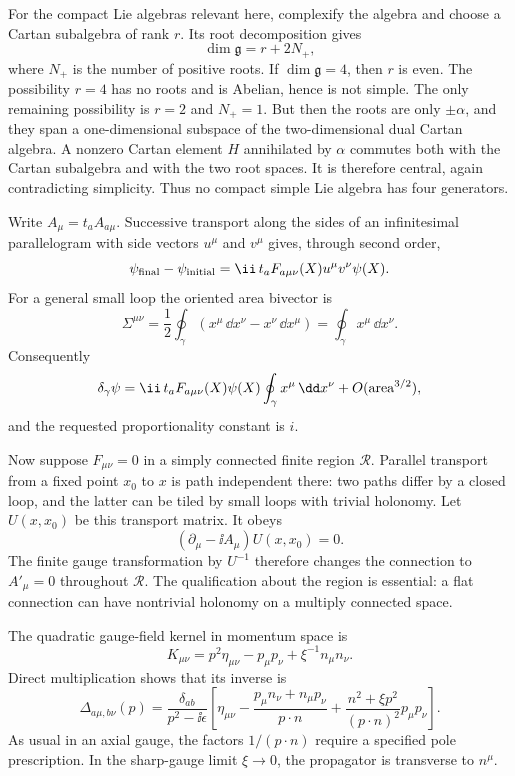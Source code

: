 \begin{enumerate}
  For the compact Lie algebras relevant here, complexify the algebra and
  choose a Cartan subalgebra of rank \(r\).  Its root decomposition gives
  \[
    \dim\mathfrak g=r+2N_+ ,
  \]
  where \(N_+\) is the number of positive roots.  If
  \(\dim\mathfrak g=4\), then \(r\) is even.  The possibility \(r=4\)
  has no roots and is Abelian, hence is not simple.  The only remaining
  possibility is \(r=2\) and \(N_+=1\).  But then the roots are only
  \(\pm\alpha\), and they span a one-dimensional subspace of the
  two-dimensional dual Cartan algebra.  A nonzero Cartan element \(H\)
  annihilated by \(\alpha\) commutes both with the Cartan subalgebra and with
  the two root spaces.  It is therefore central, again contradicting
  simplicity.  Thus no compact simple Lie algebra has four generators.

  Write
  \(A_\mu=t_a A_{a\mu}\).  Successive transport along the sides of
  an infinitesimal parallelogram with side vectors \(u^\mu\) and \(v^\mu\)
  gives, through second order,
  \[
    \psi_{\rm final}-\psi_{\rm initial}
      =\ii\,t_a F_{a\mu\nu}(X)u^\mu v^\nu\psi(X).
  \]
  For a general small loop the oriented area bivector is
  \[
    \Sigma^{\mu\nu}
      =\frac12\oint_\gamma(x^\mu\,\dd x^\nu-x^\nu\,\dd x^\mu)
      =\oint_\gamma x^\mu\,\dd x^\nu .
  \]
  Consequently
  \[
    \delta_\gamma\psi
      =\ii\,t_a F_{a\mu\nu}(X)\psi(X)
        \oint_\gamma x^\mu\,\dd x^\nu+O(\hbox{area}^{3/2}),
  \]
  and the requested proportionality constant is \(i\).

  Now suppose \(F_{\mu\nu}=0\) in a simply connected finite region
  \(\mathcal R\).  Parallel transport from a fixed point \(x_0\) to \(x\)
  is path independent there: two paths differ by a closed loop, and the
  latter can be tiled by small loops with trivial holonomy.  Let \(U(x,x_0)\)
  be this transport matrix.  It obeys
  \[
    (\partial_\mu-\ii A_\mu)U(x,x_0)=0.
  \]
  The finite gauge transformation by \(U^{-1}\) therefore changes the
  connection to
  \(A'_\mu=0\) throughout \(\mathcal R\).  The qualification about the
  region is essential: a flat connection can have nontrivial holonomy on a
  multiply connected space.

  The quadratic gauge-field kernel in momentum space is
  \[
    K_{\mu\nu}
      =p^2\eta_{\mu\nu}-p_\mu p_\nu+\xi^{-1}n_\mu n_\nu .
  \]
  Direct multiplication shows that its inverse is
  \[
    \Delta_{a\mu,b\nu}(p)
    =\frac{\delta_{ab}}{p^2-\ii\epsilon}
      \left[
        \eta_{\mu\nu}
        -\frac{p_\mu n_\nu+n_\mu p_\nu}{p\cdot n}
        +\frac{n^2+\xi p^2}{(p\cdot n)^2}p_\mu p_\nu
      \right].
  \]
  As usual in an axial gauge, the factors \(1/(p\cdot n)\) require a
  specified pole prescription.  In the sharp-gauge limit \(\xi\to0\), the
  propagator is transverse to \(n^\mu\).


\end{enumerate}
